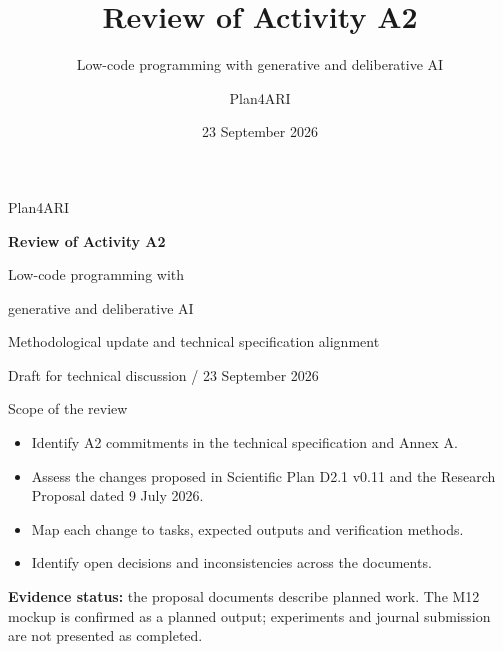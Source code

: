 \documentclass[aspectratio=169,11pt]{beamer}
\title{Review of Activity A2}
\subtitle{Low-code programming with generative and deliberative AI}
\author{Plan4ARI}
\date{23 September 2026}
\begin{document}
\begin{frame}
\vspace{9mm}
{\Large Plan4ARI}\par\vspace{4mm}
{\huge\bfseries Review of Activity A2}\par\vspace{4mm}
{\Large Low-code programming with\par generative and deliberative AI}\par\vspace{8mm}
Methodological update and technical specification alignment\par
{\small Draft for technical discussion / 23 September 2026}
\end{frame}

\begin{frame}{Scope of the review}
\begin{itemize}\items
\item Identify A2 commitments in the technical specification and Annex A.
\item Assess the changes proposed in Scientific Plan D2.1 v0.11 and the Research Proposal dated 9 July 2026.
\item Map each change to tasks, expected outputs and verification methods.
\item Identify open decisions and inconsistencies across the documents.
\end{itemize}
\medskip
\textbf{Evidence status:} the proposal documents describe planned work. The M12 mockup is confirmed as a planned output; experiments and journal submission are not presented as completed.
\end{frame}
\end{document}
